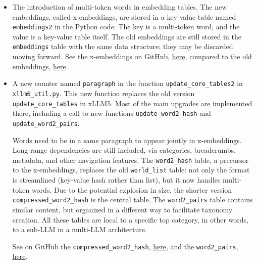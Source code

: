 \documentclass[oneside,10pt]{book}
\begin{document}
\begin{itemize}
\item The introduction of multi-token words in embedding tables. The new embeddings, called
\textcolor{index}{x-embeddings}, are stored in a key-value table named \texttt{embeddings2} in the Python code.
The key is a \textcolor{index}{multi-token} word, and the value is a key-value table itself. 
The old embeddings are still stored in the
 \texttt{embeddings} table with the same data structure; they may be discarded moving forward. 
See the x-embeddings on GitHub, \href{https://raw.githubusercontent.com/VincentGranville/Large-Language-Models/main/xllm6/xllm6_embeddings2.txt}{here}, compared to the old embeddings, \href{https://github.com/VincentGranville/Large-Language-Models/blob/main/xllm6/xllm6_embeddings2.txt}{here}. 
\vspace{1ex}
\item A new counter named \texttt{paragraph} in the function \texttt{update\_core\_tables2} in \texttt{xllm6\_util.py}. This new function replaces the old version
\texttt{update\_core\_tables} in xLLM5. Most of the main upgrades are implemented there, including a call to new functions 
\texttt{update\_word2\_hash} and 
\texttt{update\_word2\_pairs}.

\noindent Words need to be in a same paragraph to appear jointly in x-embeddings. Long-range dependencies are still included, via categories,
 breadcrumbs, metadata, and other navigation features. The \texttt{word2\_hash} table, a precursor to the x-embeddings, replaces the old 
\texttt{world\_list} table: not only the format is streamlined (key-value hash rather than list), but it now handles multi-token words. Due to the
 potential explosion in size, the shorter version \texttt{compressed\_word2\_hash} is the central table. 
The \texttt{word2\_pairs} table contains similar content, but organized in a different way to facilitate taxonomy creation. All these tables are local to a
 specific top category, in other words, to a sub-LLM in a multi-LLM architecture. 

\noindent See on GitHub the \texttt{compressed\_word2\_hash}, 
\href{https://github.com/VincentGranville/Large-Language-Models/blob/main/xllm6/xllm6_compressed_word2_hash.txt}{here}, and the  \texttt{word2\_pairs}, 
\href{https://github.com/VincentGranville/Large-Language-Models/blob/main/xllm6/xllm6_word2_pairs.txt}{here}.
\vspace{1ex}


\end{itemize}
\end{document}
